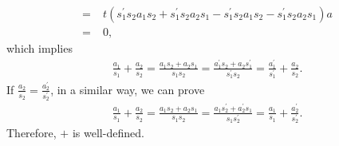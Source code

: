\begin{solution}
\begin{itemize}
\begin{align*}
            =&\;t\left(s_1^\prime s_2a_1s_2+s_1^\prime s_2a_2s_1-s_1^\prime s_2a_1 s_2-s_1^\prime s_2a_2s_1\right)a\\
            =&\;0,
        \end{align*}
        which implies
        \begin{align*}
            \frac{a_1}{s_1}+\frac{a_2}{s_2}=\frac{a_1s_2+a_2s_1}{s_1s_2}= \frac{a_1^\prime s_2+a_2s_1^\prime}{s_1^\prime s_2}=\frac{a_1^\prime}{s_1^\prime}+\frac{a_2}{s_2}.
        \end{align*}
        If $\frac{a_2}{s_2} = \frac{a_2^\prime}{s_2^\prime}$, in a similar way, we can prove
        \begin{align*}
            \frac{a_1}{s_1}+\frac{a_2}{s_2}=\frac{a_1s_2+a_2s_1}{s_1s_2}= \frac{a_1s_2^\prime+a_2^\prime s_1}{s_1s_2^\prime}=\frac{a_1}{s_1}+\frac{a_2^\prime}{s_2^\prime}.
        \end{align*}
        Therefore, $+$ is well-defined.


\end{itemize}
\end{solution}
